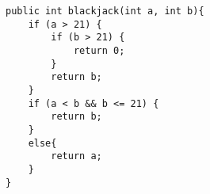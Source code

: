 \begin{lstlisting}
public int blackjack(int a, int b){
    if (a > 21) {
        if (b > 21) {
            return 0;
        }
        return b;
    }
    if (a < b && b <= 21) {
        return b;
    }
    else{
        return a;
    }
}
\end{lstlisting}
